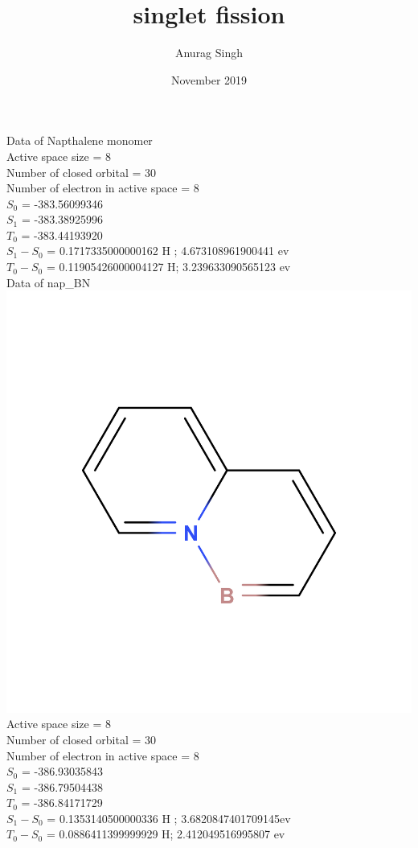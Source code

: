 \documentclass{article}
\title{singlet fission}
\author{Anurag Singh }
\date{November 2019}
\begin{document}
Data of Napthalene monomer\\
Active space size = 8\\
Number of closed orbital =  30\\
Number of electron in active space = 8\\
\(S_{0}\) = -383.56099346\\
\(S_{1}\) = -383.38925996\\
\(T_{0}\) = -383.44193920\\
\(S_{1} - S_{0} \) = 0.1717335000000162 H ; 4.673108961900441 ev\\
\(T_{0} - S_{0} \) = 0.11905426000004127 H;  3.239633090565123 ev\\

Data of nap\_BN \\
\includegraphics[scale=0.1]{Nap_BN.png}\\
Active space size = 8\\
Number of closed orbital = 30\\
Number of electron in active space = 8\\
\(S_{0}\) = -386.93035843\\
\(S_{1}\) = -386.79504438\\
\(T_{0}\) = -386.84171729\\
\(S_{1} - S_{0} \) = 0.1353140500000336 H ;  3.6820847401709145ev\\
\(T_{0} - S_{0} \) = 0.0886411399999929 H;  2.412049516995807 ev\\
\end{document}
